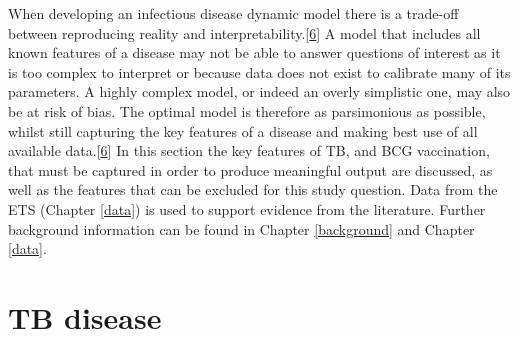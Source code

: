 \documentclass[11pt,twoside]{bristolthesis}
\begin{document}
  When developing an infectious disease dynamic model there is a trade-off between reproducing reality and interpretability.{[}\protect\hyperlink{ref-Anderson1991}{6}{]} A model that includes all known features of a disease may not be able to answer questions of interest as it is too complex to interpret or because data does not exist to calibrate many of its parameters. A highly complex model, or indeed an overly simplistic one, may also be at risk of bias. The optimal model is therefore as parsimonious as possible, whilst still capturing the key features of a disease and making best use of all available data.{[}\protect\hyperlink{ref-Anderson1991}{6}{]} In this section the key features of TB, and BCG vaccination, that must be captured in order to produce meaningful output are discussed, as well as the features that can be excluded for this study question. Data from the ETS (Chapter \ref{data}) is used to support evidence from the literature. Further background information can be found in Chapter \ref{background} and Chapter \ref{data}.
  
  \hypertarget{tb-disease}{%
  \section{TB disease}\label{tb-disease}}
  
\end{document}
